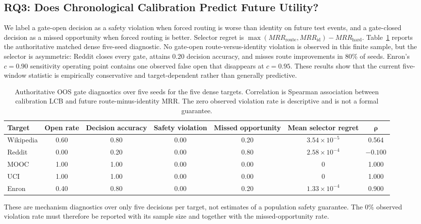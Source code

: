 \documentclass[journal]{IEEEtran}
\begin{document}
\subsection{RQ3: Does Chronological Calibration Predict Future Utility?}
We label a gate-open decision as a safety violation when forced routing is worse than identity on future test events, and a gate-closed decision as a missed opportunity when forced routing is better. Selector regret is $\max(MRR_{\mathrm{route}},MRR_{\mathrm{id}})-MRR_{\mathrm{hard}}$. Table~\ref{tab:oos_safety} reports the authoritative matched dense five-seed diagnostic. No gate-open route-versus-identity violation is observed in this finite sample, but the selector is asymmetric: Reddit closes every gate, attains 0.20 decision accuracy, and misses route improvements in 80\% of seeds. Enron's $c=0.90$ sensitivity operating point contains one observed false open that disappears at $c=0.95$. These results show that the current five-window statistic is empirically conservative and target-dependent rather than generally predictive.

\begin{table}[t]
\centering
\caption{Authoritative OOS gate diagnostics over five seeds for the five dense targets. Correlation is Spearman association between calibration LCB and future route-minus-identity MRR. The zero observed violation rate is descriptive and is not a formal guarantee.}
\label{tab:oos_safety}
\small
\begin{tabular}{lcccccc}
\toprule
\textbf{Target} & \textbf{Open rate} & \textbf{Decision accuracy} & \textbf{Safety violation} & \textbf{Missed opportunity} & \textbf{Mean selector regret} & $\boldsymbol{\rho}$ \\
\midrule
Wikipedia & 0.60 & 0.80 & 0.00 & 0.20 & $3.54\!\times\!10^{-5}$ & 0.564 \\
Reddit    & 0.00 & 0.20 & 0.00 & 0.80 & $2.58\!\times\!10^{-4}$ & $-0.100$ \\
MOOC      & 1.00 & 1.00 & 0.00 & 0.00 & 0 & 1.000 \\
UCI       & 1.00 & 1.00 & 0.00 & 0.00 & 0 & 1.000 \\
Enron     & 0.40 & 0.80 & 0.00 & 0.20 & $1.33\!\times\!10^{-4}$ & 0.900 \\
\bottomrule
\end{tabular}
\end{table}

These are mechanism diagnostics over only five decisions per target, not estimates of a population safety guarantee. The 0\% observed violation rate must therefore be reported with its sample size and together with the missed-opportunity rate.
\end{document}
